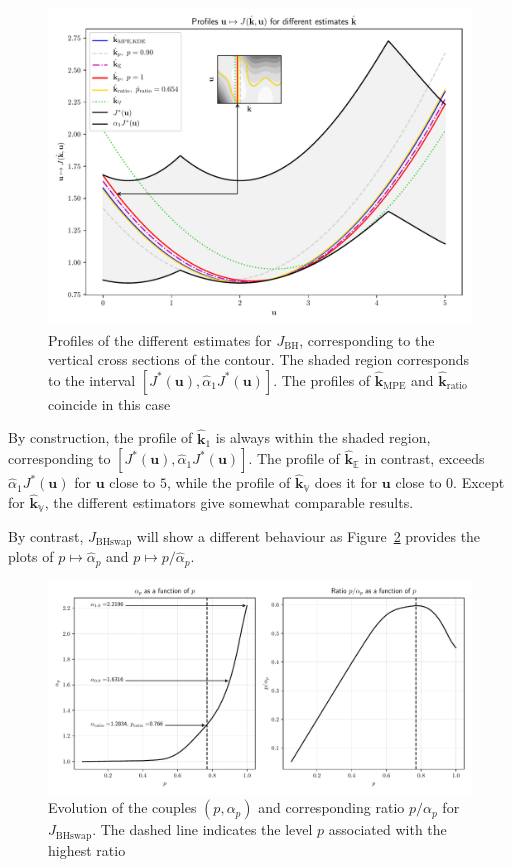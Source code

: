 \documentclass[preprint, review, 1p]{elsarticle}
\newcommand{\Ex}{\mathbb{E}}
\newcommand{\hatkmean}{\hat{\mathbf{k}}_{\Ex}}
\newcommand{\hatkvar}{\hat{\mathbf{k}}_{\mathbb{V}}}
\newcommand{\kest}{\hat{\mathbf{k}}}
\newcommand{\checkap}{{\alpha}_p}
\newcommand{\checka}{{\alpha}}
\newcommand{\checkk}{\mathbf{k}}
\newcommand{\JBH}{J_{\mathrm{BH}}}
\newcommand{\JBHS}{J_{\mathrm{BHswap}}}
\newlength{\onehalfcolumn}
\begin{document}
\begin{figure}[!h]
  \centering
\includegraphics[width=\onehalfcolumn]{Figures/FIG07.pdf}
\caption{Profiles of the different estimates for $\JBH$, corresponding to the vertical cross sections of the contour. The shaded region corresponds to the interval $[J^*(\mathbf{u}), \hat{\checka}_1 J^*(\mathbf{u})]$. The profiles of $\kest_{\mathrm{MPE}}$ and $\kest_{\mathrm{ratio}}$ coincide in this case}
\label{fig:profiles_branin}
\end{figure}

By construction, the profile of $\hat{\checkk}_1$ is always within the shaded region, corresponding to $[J^*(\mathbf{u}), \hat{\checka}_1 J^*(\mathbf{u})]$. The profile of $\hatkmean$ in contrast, exceeds $\hat{\checka}_1 J^*(\mathbf{u})$ for $\mathbf{u}$ close to $5$, while the profile of $\hatkvar$ does it for $\mathbf{u}$ close to $0$. Except for $\hatkvar$, the different estimators give somewhat comparable results.


By contrast, $\JBHS$ will show a different behaviour as Figure~\ref{fig:ratio_BHs} provides the plots of $p\mapsto \hat{\checka}_p$ and $p\mapsto p/\hat{\checka}_p$.

\begin{figure}[!h]
  \centering
\includegraphics[width=\onehalfcolumn]{Figures/FIG08.pdf}
\caption{Evolution of the couples $(p,\checkap)$ and corresponding ratio $p/\checkap$ for $\JBHS$. The dashed line indicates the level $p$ associated with the highest ratio}
\label{fig:ratio_BHs}
\end{figure}
\end{document}
